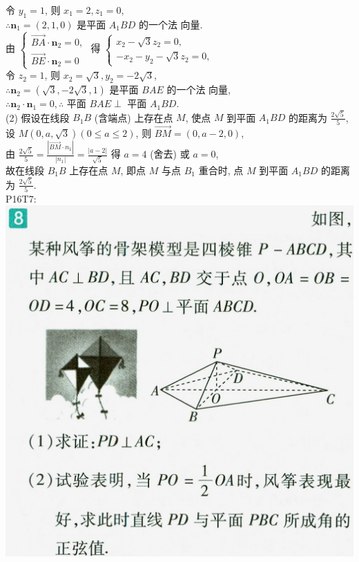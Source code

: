 \documentclass[a4paper,11pt,UTF8]{article}
\begin{document}
令 $y_1=1$, 则 $x_1=2, z_1=0$,\\
$\therefore \boldsymbol{n}_1=(2,1,0)$ 是平面 $A_1 B D$ 的一个法 向量.\\
由 $\left\{\begin{array}{l}\overrightarrow{B A} \cdot \boldsymbol{n}_2=0, \\ \overrightarrow{B E} \cdot \boldsymbol{n}_2=0\end{array}\right.$ 得 $\left\{\begin{array}{l}x_2-\sqrt{3} z_2=0, \\ -x_2-y_2-\sqrt{3} z_2=0,\end{array}\right.$\\
 令 $z_2=1$, 则 $x_2=\sqrt{3}, y_2=-2 \sqrt{3}$,\\
$\therefore \boldsymbol{n}_2=(\sqrt{3},-2 \sqrt{3}, 1)$ 是平面 $B A E$ 的一个法 向量,\\
$\therefore \boldsymbol{n}_2 \cdot \boldsymbol{n}_1=0, \therefore$ 平面 $B A E \perp$ 平面 $A_1 B D$.\\
(2) 假设在线段 $B_1 B$ (含端点) 上存在点
$M$, 使点 $M$ 到平面 $A_1 B D$ 的距离为 $\frac{2 \sqrt{5}}{5}$,\\
设 $M(0, a, \sqrt{3})(0 \leqslant a \leqslant 2)$,
则 $\overrightarrow{B M}=(0, a-2,0)$,\\
由 $\displaystyle \frac{2 \sqrt{5}}{5}=\frac{\left|\overrightarrow{B M} \cdot n_1\right|}{\left|n_1\right|}=\frac{|a-2|}{\sqrt{5}}$ 得 $a=4$ (舍去)
或 $a=0$,\\
故在线段 $B_1 B$ 上存在点 $M$, 即点 $M$ 与点 $B_1$ 重合时,
点 $M$ 到平面 $A_1 B D$ 的距离为 $\frac{2 \sqrt{5}}{5}$.\\
P16T7:\\
\includegraphics[scale=0.17]{./P18T9.jpg}\\
\end{document}
